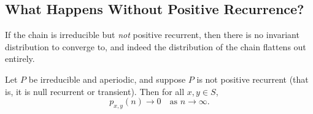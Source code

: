 \subsection{What Happens Without Positive Recurrence?}

If the chain is irreducible but \emph{not} positive recurrent, then there is no invariant distribution to converge to, and indeed the distribution of the chain flattens out entirely.

\begin{theorem}
	Let $P$ be irreducible and aperiodic, and suppose $P$ is not positive recurrent (that is, it is null recurrent or transient). Then for all $x, y \in S$,
	$$
	p_{x, y}(n) \rightarrow 0 \quad \text{as } n \rightarrow \infty.
	$$
\end{theorem}
